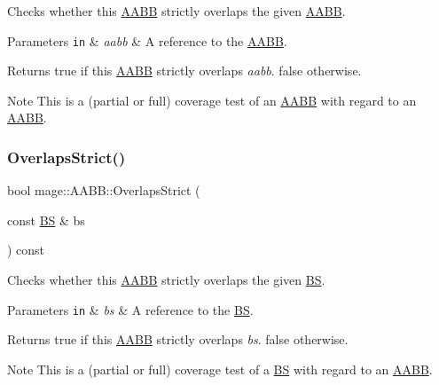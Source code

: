 Checks whether this \hyperlink{structmage_1_1_a_a_b_b}{A\+A\+BB} strictly overlaps the given \hyperlink{structmage_1_1_a_a_b_b}{A\+A\+BB}.


\begin{DoxyParams}[1]{Parameters}
\mbox{\tt in}  & {\em aabb} & A reference to the \hyperlink{structmage_1_1_a_a_b_b}{A\+A\+BB}. \\
\hline
\end{DoxyParams}
\begin{DoxyReturn}{Returns}
{\ttfamily true} if this \hyperlink{structmage_1_1_a_a_b_b}{A\+A\+BB} strictly overlaps {\itshape aabb}. {\ttfamily false} otherwise. 
\end{DoxyReturn}
\begin{DoxyNote}{Note}
This is a (partial or full) coverage test of an \hyperlink{structmage_1_1_a_a_b_b}{A\+A\+BB} with regard to an \hyperlink{structmage_1_1_a_a_b_b}{A\+A\+BB}. 
\end{DoxyNote}
\hypertarget{structmage_1_1_a_a_b_b_ac2f7270ec51acb91aed4965f135a53a9}{}\label{structmage_1_1_a_a_b_b_ac2f7270ec51acb91aed4965f135a53a9} 
\subsubsection{\texorpdfstring{Overlaps\+Strict()}{OverlapsStrict()}\hspace{0.1cm}{\footnotesize\ttfamily [2/2]}}
{\footnotesize\ttfamily bool mage\+::\+A\+A\+B\+B\+::\+Overlaps\+Strict (\begin{DoxyParamCaption}\item[{const \hyperlink{structmage_1_1_b_s}{BS} \&}]{bs }\end{DoxyParamCaption}) const\hspace{0.3cm}{\ttfamily [noexcept]}}

Checks whether this \hyperlink{structmage_1_1_a_a_b_b}{A\+A\+BB} strictly overlaps the given \hyperlink{structmage_1_1_b_s}{BS}.


\begin{DoxyParams}[1]{Parameters}
\mbox{\tt in}  & {\em bs} & A reference to the \hyperlink{structmage_1_1_b_s}{BS}. \\
\hline
\end{DoxyParams}
\begin{DoxyReturn}{Returns}
{\ttfamily true} if this \hyperlink{structmage_1_1_a_a_b_b}{A\+A\+BB} strictly overlaps {\itshape bs}. {\ttfamily false} otherwise. 
\end{DoxyReturn}
\begin{DoxyNote}{Note}
This is a (partial or full) coverage test of a \hyperlink{structmage_1_1_b_s}{BS} with regard to an \hyperlink{structmage_1_1_a_a_b_b}{A\+A\+BB}. 
\end{DoxyNote}
\hypertarget{structmage_1_1_a_a_b_b_a5aa00d8ba4751f5e7b8caa2b43a2df32}{}\label{structmage_1_1_a_a_b_b_a5aa00d8ba4751f5e7b8caa2b43a2df32} 
